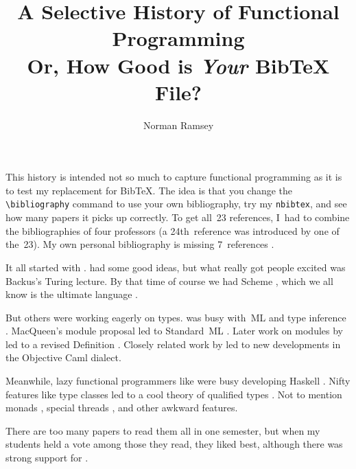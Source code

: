 \documentclass[twocolumn]{article}
\title{A Selective History of Functional Programming\\
        {\large Or, How Good is \emph{Your} Bib{\TeX} File?}}
\author{Norman Ramsey}
\begin{document}
\maketitle
\small

This history is intended not so much to capture functional programming
as it is to test my replacement for Bib{\TeX}.
The idea is that you change the
\texttt{\textbackslash bibliography} command to use your own bibliography,
try my \texttt{nbibtex}, and see how many papers it picks up
correctly.
To get all~23 references, I~had to combine the bibliographies of four
professors (a 24th~reference was introduced by one of the~23). 
My own personal bibliography is missing 7~references
\citep{iverson::book,
  :lambda-ultimate-declarative,
  Backus:liberate-neumann,
  macqueen:MODULES-for-ml,
  milner-tofte-harper:definition:1990,
  jones:qualified-TYPES:booK,
  peyton-jones-launchbury:lazy-functional-state-threads:in}.




It all started with \cite{mccarthy:symbolic-recursive}.
\cite{iverson::book} had some good ideas, but what really got people
excited was Backus's \citeyearpar{Backus:liberate-neumann}
Turing lecture.
By that time of course we had Scheme \citep{sussman-steele:scheme:197},
which we all know is the ultimate language
 \citep{:lambda-ultimate-imperative,:lambda-ultimate-declarative,:lambda-ultimate-goto}.

But others were working eagerly on types.
\cite{milner:type-polymorphism-programming} was busy with~ML
and type inference \citep{damas-milner}.
MacQueen's \citeyearpar{macqueen:MODULES-for-ml} module proposal led to
Standard~ML \citep{milner-tofte-harper:definition:1990}.
Later work on modules by \cite{harper-lillibridge:sharing} led to
a revised Definition
\citep{milner-tofte-macqueen-harper}.
Closely related work by
\cite{leroy:modules:1994,leroy:functors:1995,leroy:modular-module-system}
led to new developments in the Objective Caml dialect.

Meanwhile, lazy functional programmers like
\cite{hughes:why-functional-matters} were busy developing Haskell 
\citep{peyton-jones:haskell:book}.
Nifty features like type classes
\citep{wadler-blott:ad-hoc-polymorphism} led to a cool theory of
qualified types \citep{jones:qualified-TYPES:booK}.
Not to mention monads \citep{wadler:essence-functional},
special threads
\citep{peyton-jones-launchbury:lazy-functional-state-threads:in},
and other awkward \citep{peyton-jones:awkward-squad} features.

There are too many papers to read them all in one semester, but when
my students held a vote among those they read, they liked
\cite{wadler-blott} best, although there was strong support for
\cite{leroy:separate-compilation}. 



\providecommand\includeftpref{} %


\end{document}
